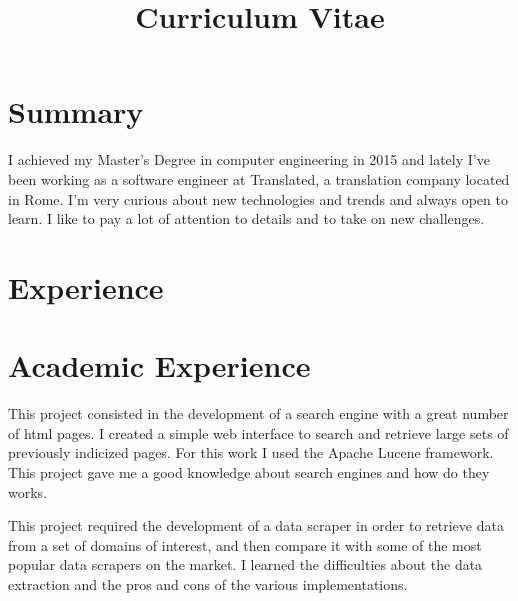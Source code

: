 \documentclass[11pt,a4paper,sans]{moderncv} %
\title{Curriculum Vitae}
\begin{document}
\makecvtitle %

\section{Summary}
I achieved my Master's Degree in computer engineering in 2015 and lately I've been working as a software engineer at Translated, a translation company located in Rome.
\newline{}
I'm very curious about new technologies and trends and always open to learn. I like to pay a lot of attention to details and to take on new challenges.


\section{Experience}



\section{Academic Experience}

{This project consisted in the development of a search engine with a great number of html pages. I created a simple web interface to search and retrieve large sets of previously indicized pages. For this work I used the Apache Lucene framework. This project gave me a good knowledge about search engines and how do they works.}


{This project required the development of a data scraper in order to retrieve data from a set of domains of interest, and then compare it with some of the most popular data scrapers on the market. I learned the difficulties about the data extraction and the pros and cons of the various implementations.}
\end{document}
